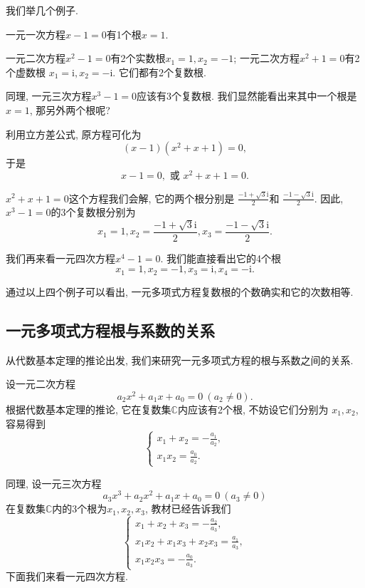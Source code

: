 \documentclass[12pt,a4paper]{ctexart}
\begin{document}
我们举几个例子.

一元一次方程$x-1=0$有1个根$x = 1$.

一元二次方程$x^2-1=0$有2个实数根$x_1 = 1, x_2 = -1$;
一元二次方程$x^2+1=0$有2个虚数根 $x_1 = \mathrm{i}, x_2 = -\mathrm{i}.$
它们都有2个复数根.

同理, 一元三次方程$x^3-1 = 0$应该有3个复数根. 我们显然能看出来其中一个根是$x = 1$,
那另外两个根呢?

利用立方差公式, 原方程可化为$$(x-1)(x^2 + x + 1) = 0,$$
于是$$x - 1 = 0, \text{\ 或\ } x^2 + x + 1 = 0.$$

$x^2 + x + 1 = 0$这个方程我们会解, 它的两个根分别是
$\displaystyle\frac{-1+\sqrt{3}\mathrm{i}}{2}$和
$\displaystyle\frac{-1-\sqrt{3}\mathrm{i}}{2}$. 因此,
$x^3-1 = 0$的3个复数根分别为
\setlength{\abovedisplayskip}{10pt}
\setlength{\belowdisplayskip}{10pt}
$$x_1 = 1, x_2 = \frac{-1+\sqrt{3}\mathrm{i}}{2}, x_3 = \frac{-1-\sqrt{3}\mathrm{i}}{2}.$$

我们再来看一元四次方程$x^4-1 = 0$. 我们能直接看出它的4个根
\setlength{\abovedisplayskip}{3pt}
\setlength{\belowdisplayskip}{3pt}
$$x_1 = 1, x_2 = -1, x_3 = \mathrm{i}, x_4 = -\mathrm{i}.$$

通过以上四个例子可以看出, 一元多项式方程复数根的个数确实和它的次数相等.

\subsection{一元多项式方程根与系数的关系}

从代数基本定理的推论出发, 我们来研究一元多项式方程的根与系数之间的关系.

设一元二次方程$$a_2x^2 + a_1x + a_0 = 0\ (a_2 \neq 0).$$
根据代数基本定理的推论, 它在复数集$\mathbb{C}$内应该有2个根, 不妨设它们分别为
$x_1, x_2$, 容易得到
\setlength{\abovedisplayskip}{10pt}
\setlength{\belowdisplayskip}{10pt}
$$\begin{cases*}
        x_1 + x_2 = -\displaystyle\frac{a_1}{a_2}, \\
        x_1x_2 = \displaystyle\frac{a_0}{a_2}.
    \end{cases*}$$
\setlength{\abovedisplayskip}{3pt}
\setlength{\belowdisplayskip}{3pt}

同理, 设一元三次方程$$a_3x^3 + a_2x^2 + a_1x + a_0 = 0\ (a_3 \neq 0)$$
在复数集$\mathbb{C}$内的3个根为$x_1, x_2, x_3$, 教材已经告诉我们
\setlength{\abovedisplayskip}{10pt}
\setlength{\belowdisplayskip}{10pt}
$$\begin{cases*}
        x_1 + x_2 + x_3 = -\displaystyle\frac{a_2}{a_3},         \\
        x_1x_2 + x_1x_3 + x_2x_3 = \displaystyle\frac{a_1}{a_3}, \\
        x_1x_2x_3 = -\displaystyle\frac{a_0}{a_3}.
    \end{cases*}$$
下面我们来看一元四次方程.
\setlength{\abovedisplayskip}{3pt}
\setlength{\belowdisplayskip}{3pt}
\end{document}
